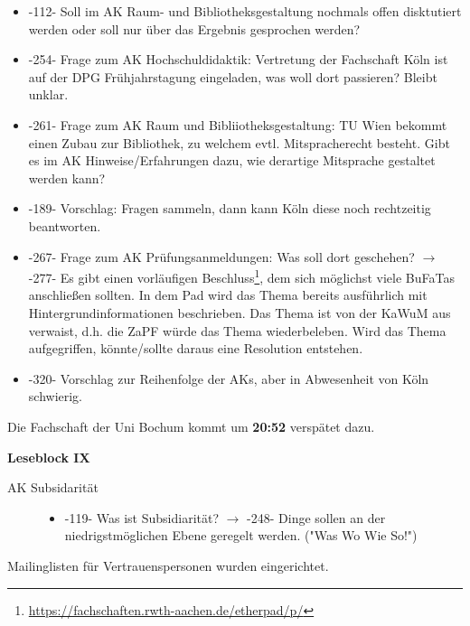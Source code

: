     \begin{itemize}
      \item -112- Soll im AK Raum- und Bibliotheksgestaltung nochmals offen disktutiert werden oder soll nur über das Ergebnis gesprochen werden?
      \item -254- Frage zum AK Hochschuldidaktik: Vertretung der Fachschaft Köln ist auf der DPG Frühjahrstagung eingeladen, was woll dort passieren? Bleibt unklar.
      \item -261- Frage zum AK Raum und Bibliiotheksgestaltung: TU Wien bekommt einen Zubau zur Bibliothek, zu welchem evtl. Mitspracherecht besteht. Gibt es im AK Hinweise/Erfahrungen dazu, wie derartige Mitsprache gestaltet werden kann?
      \item -189- Vorschlag: Fragen sammeln, dann kann Köln diese noch rechtzeitig beantworten.
      \item -267- Frage zum AK Prüfungsanmeldungen: Was soll dort geschehen? $\rightarrow$ -277- Es gibt einen vorläufigen Beschluss\footnote{\url{https://fachschaften.rwth-aachen.de/etherpad/p/}}, dem sich möglichst viele BuFaTas anschließen sollten.
        In dem Pad wird das Thema bereits ausführlich mit Hintergrundinformationen beschrieben. Das Thema ist von der KaWuM aus verwaist, d.h. die ZaPF würde das Thema wiederbeleben. Wird das Thema aufgegriffen, könnte/sollte daraus eine Resolution entstehen.
      \item -320- Vorschlag zur Reihenfolge der AKs, aber in Abwesenheit von Köln schwierig.
    \end{itemize}

    \begin{info}{}
      Die Fachschaft der Uni Bochum kommt um \textbf{20:52} verspätet dazu.
    \end{info}

    \textbf{Leseblock IX} \\

    \begin{description}
      \item[AK Subsidarität]
      \begin{itemize}
        \item -119- Was ist Subsidiarität? $\rightarrow$ -248- Dinge sollen an der niedrigstmöglichen Ebene geregelt werden. ("Was Wo Wie So!")
      \end{itemize}
    \end{description}

    \begin{info}{}
      Mailinglisten für Vertrauenspersonen wurden eingerichtet.
    \end{info}

